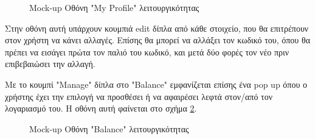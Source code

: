 \documentclass[12pt,a4paper]{article}
\begin{document}
\begin{figure}[H]
	\caption{Mock-up Οθόνη "My Profile" λειτουργικότητας}
	\label{Mock-up Οθόνη "My Profile" λειτουργικότητας}
\end{figure}

Στην οθόνη αυτή υπάρχουν κουμπιά edit δίπλα από κάθε στοιχείο, που θα επιτρέπουν στον χρήστη να κάνει αλλαγές. Επίσης θα μπορεί να αλλάξει τον κωδικό του, όπου θα πρέπει να εισάγει πρώτα τον παλιό του κωδικό, και μετά δύο φορές τον νέο πριν επιβεβαιώσει την αλλαγή. 

Με το κουμπί "Manage" δίπλα στο "Balance" εμφανίζεται επίσης ένα pop up όπου ο χρήστης έχει την επιλογή να προσθέσει ή να αφαιρέσει λεφτά στον/από τον λογαριασμό του. Η οθόνη αυτή φαίνεται στο σχήμα \ref{Mock-up Οθόνη "Balance" λειτουργικότητας}.

\begin{figure}[H]
	\caption{Mock-up Οθόνη "Balance" λειτουργικότητας}
	\label{Mock-up Οθόνη "Balance" λειτουργικότητας}
\end{figure}
\end{document}
